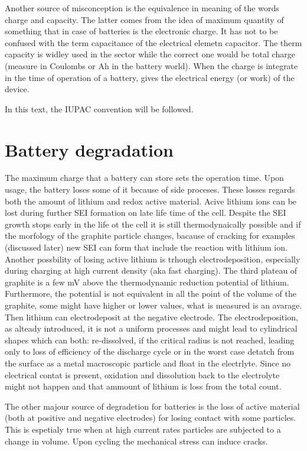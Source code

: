 Another source of misconception is the equivalence in meaning of the words charge and capacity. The latter comes from the idea of maximum quantity of something that in case of batteries is the electronic charge. It has not to be confused with the term capacitance of the electrical elemetn capacitor. The therm capacity is widley used in the sector while the correct one would be total charge (measure in Coulombs or Ah in the battery world). When the charge is integrate in the time of operation of a battery, gives the electrical energy (or work) of the device.

In this text, the IUPAC convention will be followed.



\section{Battery degradation}

The maximum charge that a battery can store sets the operation time. Upon usage, the battery loses some of it because of side proceses. These losses regards both the amount of lithium and redox active material. Acive lithium ions can be lost during further SEI formation on late life time of the cell. Despite the SEI growth stops early in the life ot the cell it is still thermodynaically possible and if the morfology of the graphite particle changes, bacause of cracking for examples (discussed later) new SEI can form that include the reaction with lithium ion. Another possbility of losing active lithium is trhough electrodeposition, especially during charging at high current density (aka fast charging). The third plateau of graphite is a few mV above the thermodynamic reduction potential of lithium. Furthermore, the potential is not equivalent in all the point of the volume of the graphite, some might have higher or lower values, what is measured is an avarage. Then lithium can electrodeposit at the negative electrode. The electrodeposition, as alteady introduced, it is not a uniform processes and might lead to cylindrical shapes which can both: re-dissolved, if the critical radius is not reached, leading only to loss of efficiency of the discharge cycle or in the worst case detatch from the surface as a metal macroscopic particle and float in the electrlyte. Since no electrical contat is present, oxidation and dissolution back to the electrolyte might not happen and that ammount of lithium is loss from the total count.

The other majour source of degradetion for batteries is the loss of active material (both at positive and negative electrodes) for losing contact with some particles. This is espetialy true when at high current rates particles are subjected to a change in volume. Upon cycling the mechanical stress can induce cracks.

